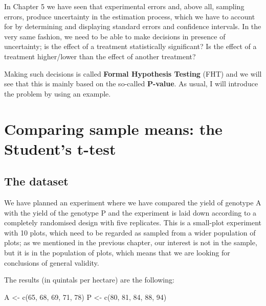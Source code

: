 \documentclass[a4paper,12pt,oneside]{book}
\newenvironment{Shaded}{\begin{snugshade}}{\end{snugshade}}
\newcommand{\DecValTok}[1]{#1}
\newcommand{\OtherTok}[1]{#1}
\newcommand{\FunctionTok}[1]{#1}
\newcommand{\NormalTok}[1]{#1}
\begin{document}
In Chapter 5 we have seen that experimental errors and, above all, sampling errors, produce uncertainty in the estimation process, which we have to account for by determining and displaying standard errors and confidence intervals. In the very same fashion, we need to be able to make decisions in presence of uncertainty; is the effect of a treatment statistically significant? Is the effect of a treatment higher/lower than the effect of another treatment?

Making such decisions is called \textbf{Formal Hypothesis Testing} (FHT) and we will see that this is mainly based on the so-called \textbf{P-value}. As usual, I will introduce the problem by using an example.

\hypertarget{comparing-sample-means-the-students-t-test}{%
\section{Comparing sample means: the Student's t-test}\label{comparing-sample-means-the-students-t-test}}

\hypertarget{the-dataset}{%
\subsection{The dataset}\label{the-dataset}}

We have planned an experiment where we have compared the yield of genotype A with the yield of the genotype P and the experiment is laid down according to a completely randomised design with five replicates. This is a small-plot experiment with 10 plots, which need to be regarded as sampled from a wider population of plots; as we mentioned in the previous chapter, our interest is not in the sample, but it is in the population of plots, which means that we are looking for conclusions of general validity.

The results (in quintals per hectare) are the following:

\begin{Shaded}
\begin{Highlighting}[]
\NormalTok{A }\OtherTok{\textless{}{-}} \FunctionTok{c}\NormalTok{(}\DecValTok{65}\NormalTok{, }\DecValTok{68}\NormalTok{, }\DecValTok{69}\NormalTok{, }\DecValTok{71}\NormalTok{, }\DecValTok{78}\NormalTok{)}
\NormalTok{P }\OtherTok{\textless{}{-}} \FunctionTok{c}\NormalTok{(}\DecValTok{80}\NormalTok{, }\DecValTok{81}\NormalTok{, }\DecValTok{84}\NormalTok{, }\DecValTok{88}\NormalTok{, }\DecValTok{94}\NormalTok{)}
\end{Highlighting}
\end{Shaded}
\end{document}

